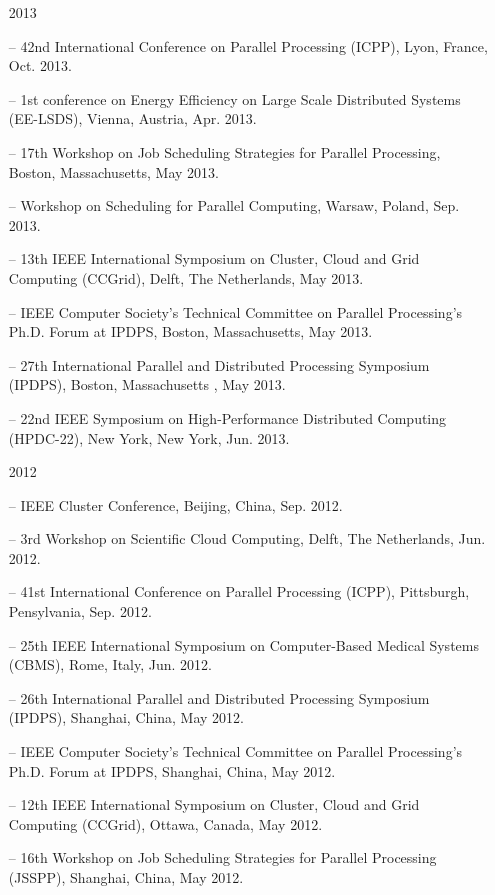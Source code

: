 \documentclass[times,11pt]{letter}
\begin{document}
\begin{itemize}
\item [2013]
\item[--] 42nd International Conference on Parallel Processing (ICPP),  Lyon, France, Oct. 2013.
\item[--] 1st conference on Energy Efficiency on Large Scale Distributed Systems (EE-LSDS), Vienna, Austria, Apr. 2013.
\item[--] 17th Workshop on Job Scheduling Strategies for Parallel Processing, Boston, Massachusetts, May 2013.
\item[--] Workshop on Scheduling for Parallel Computing, Warsaw, Poland, Sep. 2013.
\item[--]  13th IEEE International Symposium on Cluster, Cloud and Grid
Computing (CCGrid), Delft, The Netherlands, May 2013.
\item[--]  IEEE Computer Society's Technical Committee on Parallel Processing's Ph.D. Forum at IPDPS, Boston, Massachusetts, May 2013.
\item[--]  27th International Parallel and Distributed Processing Symposium (IPDPS), Boston, Massachusetts , May 2013.
\item[--]  22nd IEEE Symposium on High-Performance Distributed Computing (HPDC-22), New York, New York, Jun. 2013. 

\item [2012]
\item[--]  IEEE Cluster Conference, Beijing, China, Sep. 2012.
\item[--]  3rd Workshop on Scientific Cloud Computing, Delft, The Netherlands, Jun. 2012.
\item[--]  41st  International Conference on Parallel Processing  (ICPP), Pittsburgh, Pensylvania, Sep. 2012.
\item[--]   25th IEEE International Symposium on Computer-Based Medical Systems (CBMS), Rome, Italy, Jun. 2012.
\item[--]  26th International Parallel and Distributed Processing Symposium (IPDPS), Shanghai, China, May 2012.
\item[--]  IEEE Computer Society's Technical Committee on Parallel Processing's Ph.D. Forum at IPDPS, Shanghai, China, May 2012.
\item[--]  12th IEEE International Symposium on Cluster, Cloud and Grid
Computing (CCGrid), Ottawa, Canada, May 2012.
\item[--]  16th Workshop on Job Scheduling Strategies for Parallel Processing (JSSPP),  Shanghai, China, May 2012.


\end{itemize}
\end{document}
